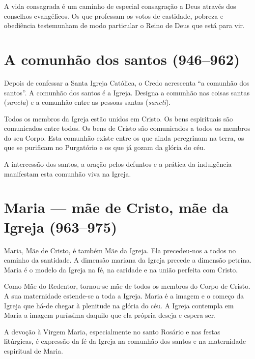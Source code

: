 A vida consagrada é um caminho de especial consagração a Deus através dos conselhos evangélicos. Os que professam os votos de castidade, pobreza e obediência testemunham de modo particular o Reino de Deus que está para vir.

\section{A comunhão dos santos (946--962)}

Depois de confessar a Santa Igreja Católica, o Credo acrescenta ``a comunhão dos santos''. A comunhão dos santos é a Igreja. Designa a comunhão nas coisas santas (\emph{sancta}) e a comunhão entre as pessoas santas (\emph{sancti}).

Todos os membros da Igreja estão unidos em Cristo. Os bens espirituais são comunicados entre todos. Os bens de Cristo são comunicados a todos os membros do seu Corpo. Esta comunhão existe entre os que ainda peregrinam na terra, os que se purificam no Purgatório e os que já gozam da glória do céu.

A intercessão dos santos, a oração pelos defuntos e a prática da indulgência manifestam esta comunhão viva na Igreja.

\section{Maria --- mãe de Cristo, mãe da Igreja (963--975)}

Maria, Mãe de Cristo, é também Mãe da Igreja. Ela precedeu-nos a todos no caminho da santidade. A dimensão mariana da Igreja precede a dimensão petrina. Maria é o modelo da Igreja na fé, na caridade e na união perfeita com Cristo.

Como Mãe do Redentor, tornou-se mãe de todos os membros do Corpo de Cristo. A sua maternidade estende-se a toda a Igreja. Maria é a imagem e o começo da Igreja que há-de chegar à plenitude na glória do céu. A Igreja contempla em Maria a imagem puríssima daquilo que ela própria deseja e espera ser.

A devoção à Virgem Maria, especialmente no santo Rosário e nas festas litúrgicas, é expressão da fé da Igreja na comunhão dos santos e na maternidade espiritual de Maria.